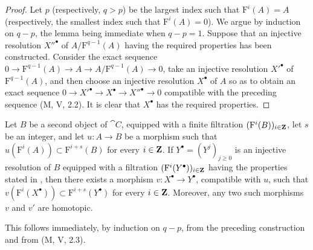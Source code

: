 \begin{proof}
Let $p$ (respectively, $q>p$) be the largest index such that
$\mathrm{F}^i(A)=A$ (respectively, the smallest index such that
$\mathrm{F}^i(A)=0$).
We argue by induction on $q-p$, the lemma being immediate when
$q-p=1$.
Suppose that an injective resolution ${X''}^\bullet$ of
$A/\mathrm{F}^{q-1}(A)$ having the required properties has been
constructed.
Consider the exact sequence $0\longrightarrow\mathrm{F}^{q-1}(A)
\longrightarrow A
\longrightarrow A/\mathrm{F}^{q-1}(A)
\longrightarrow0$,
take an injective resolution ${X'}^\bullet$ of
$\mathrm{F}^{q-1}(A)$, and then choose an injective resolution
$X^\bullet$ of $A$ so as to obtain an exact sequence $0\longrightarrow {X'}^\bullet
\longrightarrow X^\bullet
\longrightarrow {X''}^\bullet
\longrightarrow0$
compatible with the preceding sequence (M, V, 2.2).
It is clear that $X^\bullet$ has the required properties.
\end{proof}

\begin{corollary}[13.6.3]
\label{0.13.6.3}
Let $B$ be a second object of $\cat{C}$, equipped with a finite
filtration $(\mathrm{F}^i(B))_{i\in\mathbf{Z}}$, let $s$ be an integer,
and let $u:A\longrightarrow B$ be a morphism such that $u(\mathrm{F}^i(A))\subset\mathrm{F}^{i+s}(B)$
for every $i\in\mathbf{Z}$.
If $Y^\bullet=(Y^j)_{j\geq0}$ is an injective resolution of $B$
equipped with a filtration
$(\mathrm{F}^i(Y^\bullet))_{i\in\mathbf{Z}}$ having the properties stated
in , then there exists a morphism
$v:X^\bullet\longrightarrow Y^\bullet$, compatible with $u$, such
that $v(\mathrm{F}^i(X^\bullet))
\subset
\mathrm{F}^{i+s}(Y^\bullet)$
for every $i\in\mathbf{Z}$.
Moreover, any two such morphisms $v$ and $v'$ are homotopic.
\end{corollary}

This follows immediately, by induction on $q-p$, from the preceding
construction and from (M, V, 2.3).

